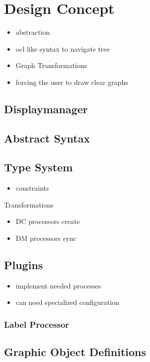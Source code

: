 \chapter{Design Concept}


\begin{itemize}
  \item abstraction
  \item ocl like syntax to navigate tree
  \item Graph Transformations 
  \item forcing the user to draw clear graphs
\end{itemize}


\section{Displaymanager}
\cite{baar_correctly_2008}


\section{Abstract Syntax}

\section{Type System}
\begin{itemize}
  \item constraints
\end{itemize}

Transformations

\begin{itemize}
  \item DC processors create
  \item DM processors sync
\end{itemize}

\section{Plugins}
\begin{itemize}
  \item implement needed processes
  \item can need specialized configuration
\end{itemize}
\subsection{Label Processor}


\section{Graphic Object Definitions}